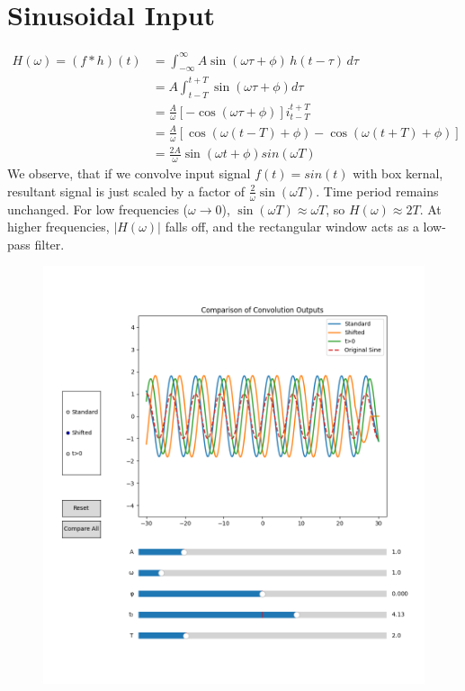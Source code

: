 \documentclass[12pt,a4paper]{report}
\newcommand{\brak}[1]{\ensuremath{\left(#1\right)}}
\providecommand{\sbrak}[1]{\ensuremath{{}\left[#1\right]}}
\providecommand{\brak}[1]{\ensuremath{\left(#1\right)}}
\begin{document}
\section{Sinusoidal Input}
\begin{align*}
H\brak{\omega} = (f \ast h)\brak{t} &= \int_{-\infty}^\infty A\sin\brak{\omega \tau + \phi} \, h\brak{t - \tau} \, d\tau \\
&= A\int_{t-T}^{t+T} \sin\brak{\omega\tau + \phi}d\tau \\
&= \frac{A}{\omega}\sbrak{-\cos\brak{\omega\tau + \phi}}i_{t-T}^{t+T} \\
&= \frac{A}{\omega}\sbrak{\cos\brak{\omega (t-T)+  \phi} - \cos\brak{\omega (t+T) + \phi}} \\
&= \frac{2A}{\omega}\sin(\omega t + \phi)sin(\omega T)
\end{align*}
We observe, that if we convolve input signal $f\brak{t} = sin\brak{t}$ with box kernal, resultant signal is just scaled by a factor of $\frac{2}{\omega}\sin\brak{\omega T}$. Time period remains unchanged.
For low frequencies ($\omega \to 0$), $\sin(\omega T) \approx \omega T$, so $H(\omega) \approx 2T$. At higher frequencies, $|H(\omega)|$ falls off, and the rectangular window acts as a low-pass filter.
\begin{figure}[h!]
    \centering
    \includegraphics[width=0.6\linewidth]{figs/sine_conv.png}
    \label{fig:enter-label}
\end{figure}
\end{document}
